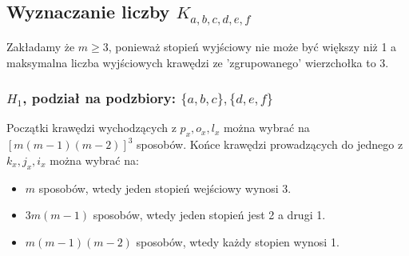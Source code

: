 \documentclass{article}
\begin{document}
\begin{figure}[h]
\end{figure}

\subsection{Wyznaczanie liczby $K_{a,b,c,d,e,f}$}
Zakładamy że $m \geq 3$, ponieważ stopień wyjściowy nie może być większy niż 1 a maksymalna liczba wyjściowych krawędzi ze 'zgrupowanego' wierzchołka to 3.

\subsubsection{$H_1$, podział na podzbiory: $\{ a,b,c \}, \{ d,e,f \}$}
Początki krawędzi wychodzących z $p_x, o_x, l_x$ można wybrać na $[m(m-1)(m-2)]^3$ sposobów.
Końce krawędzi prowadzących do jednego z $k_x, j_x, i_x$ można wybrać na:
\begin{itemize}
  \item $m$ sposobów, wtedy jeden stopień wejściowy wynosi 3.
  \item $3m(m-1)$ sposobów, wtedy jeden stopień jest 2 a drugi 1.
  \item $m(m-1)(m-2)$ sposobów, wtedy każdy stopien wynosi 1.
\end{itemize}
\end{document}
